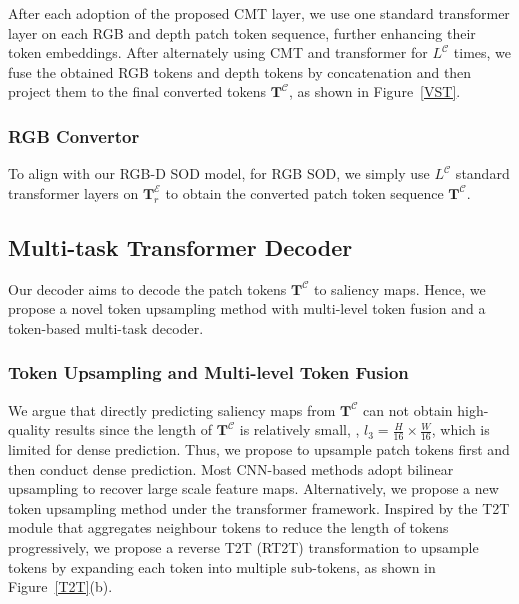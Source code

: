 \documentclass[10pt,twocolumn,letterpaper]{article}
\begin{document}
After each adoption of the proposed CMT layer, we use one standard transformer layer 
on each RGB and depth patch token sequence, further enhancing their token embeddings. After alternately using CMT and transformer for $L^{\mathcal{C}}$ times, we fuse the obtained RGB tokens and depth tokens by concatenation and then project them to the final converted tokens $\bm{T}^{\mathcal{C}}$, as shown in Figure~\ref{VST}.

\vspace{-3mm}
\subsubsection{RGB Convertor}
To align with our RGB-D SOD model, for RGB SOD, we simply use $L^{\mathcal{C}}$ standard transformer layers on $\bm{T}_r^{\mathcal{E}}$ to obtain the converted patch token sequence $\bm{T}^{\mathcal{C}}$.

\subsection{Multi-task Transformer Decoder}
Our decoder aims to decode the patch tokens $\bm{T}^{\mathcal{C}}$ to saliency maps. 
Hence,
we propose a novel token upsampling method with multi-level token fusion and a token-based multi-task decoder.
\subsubsection{Token Upsampling and Multi-level Token Fusion}
We argue that directly predicting saliency maps from $\bm{T}^{\mathcal{C}}$ can not obtain high-quality results since the length of $\bm{T}^{\mathcal{C}}$ is relatively small, \ie, $l_3 = \frac{H}{16} \times \frac{W}{16}$, which is limited for dense prediction.
Thus, we propose to upsample patch tokens first and then conduct dense prediction.
Most CNN-based methods \cite{GateNet,zhao2019EGNet,liu2020S2MA,Fu2020JLDCF} adopt bilinear upsampling to recover large scale feature maps. 
Alternatively, we propose a new token upsampling method under the transformer framework. Inspired by the T2T module \cite{yuan2021tokens} that aggregates neighbour tokens to reduce the length of tokens progressively, we propose a reverse T2T (RT2T) transformation to upsample tokens by expanding each token into multiple sub-tokens, as shown in Figure~\ref{T2T}(b).
\end{document}
